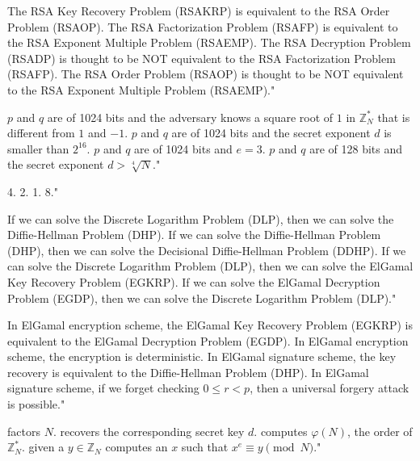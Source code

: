 {The RSA Key Recovery Problem (RSAKRP) is equivalent to the RSA Order Problem (RSAOP).}
{The RSA Factorization Problem (RSAFP) is equivalent to the RSA Exponent Multiple Problem (RSAEMP).}
{The RSA Decryption Problem (RSADP) is thought to be NOT equivalent to the RSA Factorization Problem (RSAFP).}
{The RSA Order Problem (RSAOP) is thought to be NOT equivalent to the RSA Exponent Multiple Problem (RSAEMP)."}

{$p$ and $q$ are of 1024 bits and the adversary knows a square root of $1$ in $\mathbb{Z}_N^*$ that is different from $1$ and $-1$.}
{$p$ and $q$ are of 1024 bits and the secret exponent $d$ is smaller than $2^{16}$.}
{$p$ and $q$ are of 1024 bits and $e =3$.}
{$p$ and $q$ are of 128 bits and the secret exponent $d> \sqrt[4]{N}$."}

{4.}
{2.}
{1.}
{8."}

{If we can solve the Discrete Logarithm Problem (DLP), then we can solve the Diffie-Hellman Problem (DHP).}
{If we can solve the Diffie-Hellman Problem (DHP), then we can solve the Decisional Diffie-Hellman Problem (DDHP).}
{If we can solve the Discrete Logarithm Problem (DLP), then we can solve the ElGamal Key Recovery Problem (EGKRP).}
{If we can solve the ElGamal Decryption Problem (EGDP), then we can solve the Discrete Logarithm Problem (DLP)."}

{In ElGamal encryption scheme, the ElGamal Key Recovery Problem (EGKRP) is equivalent to the ElGamal Decryption Problem (EGDP).}
{In ElGamal encryption scheme, the encryption is deterministic.}
{In ElGamal signature scheme, the key recovery is equivalent to the Diffie-Hellman Problem (DHP).}
{In ElGamal signature scheme, if we forget checking $0 \leq r < p$, then a universal forgery attack is possible."}

{factors $N$.}
{recovers the corresponding secret key $d$.}
{computes $\varphi(N)$, the order of $\mathbb{Z}_N^*$.}
{given a $y\in \mathbb{Z}_N$ computes an $x$ such that $x^e \equiv y \pmod{N}$."}


